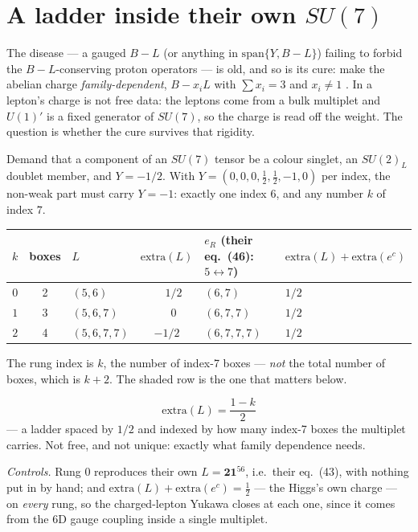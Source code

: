 \documentclass[11pt,a4paper]{article}
\newcommand{\su}[1]{SU(#1)}
\newcommand{\rep}[1]{\mathbf{#1}}
\newenvironment{keyeq}
  {\begin{center}\setlength{\fboxsep}{9pt}\setlength{\fboxrule}{0.8pt}%
   \begin{lrbox}{\keyeqbox}\begin{minipage}{0.88\textwidth}}
  {\end{minipage}\end{lrbox}%
   \fcolorbox{hdrblue!55}{hdrblue!6}{\usebox{\keyeqbox}}\end{center}}
\begin{document}
\section{A ladder inside their own $\su7$}\label{sec:ladder}

The disease --- a gauged $B-L$ (or anything in $\mathrm{span}\{Y,B-L\}$) failing to forbid the
$B-L$-conserving proton operators --- is old, and so is its cure: make the abelian charge
\emph{family-dependent}, $B-x_iL$ with $\sum x_i=3$ and $x_i\neq1$ \cite{FamilyU1}. In \cite{KM25}
a lepton's charge is not free data: the leptons come from a bulk multiplet and $U(1)'$ is a fixed
generator of $\su7$, so the charge is read off the weight. The question is whether the cure survives
that rigidity.

Demand that a component of an $\su7$ tensor be a colour singlet, an $\su2_L$ doublet member, and
$Y=-1/2$. With $Y=(0,0,0,\tfrac12,\tfrac12,-1,0)$ per index, the non-weak part must carry $Y=-1$:
exactly one index $6$, and any number $k$ of index $7$.

\begin{center}\small
\begin{tabular}{cclcll}
\toprule
\rowcolor{hdrblue!12}
$k$ & boxes & $L$ & $\mathrm{extra}(L)$ & $e_R$ (their eq.~(46): $5\leftrightarrow7$) &
$\mathrm{extra}(L)+\mathrm{extra}(e^c)$\\
\midrule
$0$ & 2 & $(5,6)$ & $\phantom{-}1/2$ & $(6,7)$ & $1/2$\\
\rowcolor{amber!14}
$1$ & 3 & $(5,6,7)$ & $\phantom{-}0$ & $(6,7,7)$ & $1/2$\\
$2$ & 4 & $(5,6,7,7)$ & $-1/2$ & $(6,7,7,7)$ & $1/2$\\
\bottomrule
\end{tabular}
\end{center}

\noindent
The rung index is $k$, the number of index-7 boxes --- \emph{not} the total number of boxes, which
is $k+2$. The shaded row is the one that matters below.

\begin{keyeq}
\[
\mathrm{extra}(L)=\frac{1-k}{2}
\]
--- a ladder spaced by $1/2$ and indexed by how many index-7 boxes the multiplet carries. Not free,
and not unique: exactly what family dependence needs.
\end{keyeq}

\emph{Controls.} Rung 0 reproduces their own $L=\rep{21}^{56}$, i.e.\ their eq.~(43), with nothing
put in by hand; and $\mathrm{extra}(L)+\mathrm{extra}(e^c)=\tfrac12$ --- the Higgs's own charge ---
on \emph{every} rung, so the charged-lepton Yukawa closes at each one, since it comes from the 6D
gauge coupling inside a single multiplet.
\end{document}
